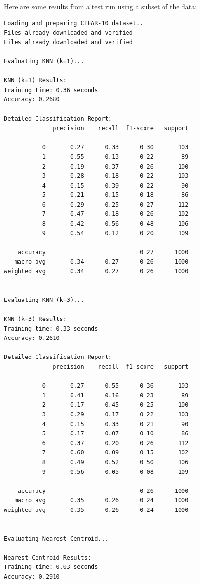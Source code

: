 \documentclass[lettersize,journal]{IEEEtran}
\begin{document}
Here are some results from a test run using a subset of the data:
\begin{verbatim}
Loading and preparing CIFAR-10 dataset...
Files already downloaded and verified
Files already downloaded and verified

Evaluating KNN (k=1)...

KNN (k=1) Results:
Training time: 0.36 seconds
Accuracy: 0.2680

Detailed Classification Report:
              precision    recall  f1-score   support

           0       0.27      0.33      0.30       103
           1       0.55      0.13      0.22        89
           2       0.19      0.37      0.26       100
           3       0.28      0.18      0.22       103
           4       0.15      0.39      0.22        90
           5       0.21      0.15      0.18        86
           6       0.29      0.25      0.27       112
           7       0.47      0.18      0.26       102
           8       0.42      0.56      0.48       106
           9       0.54      0.12      0.20       109

    accuracy                           0.27      1000
   macro avg       0.34      0.27      0.26      1000
weighted avg       0.34      0.27      0.26      1000


Evaluating KNN (k=3)...

KNN (k=3) Results:
Training time: 0.33 seconds
Accuracy: 0.2610

Detailed Classification Report:
              precision    recall  f1-score   support

           0       0.27      0.55      0.36       103
           1       0.41      0.16      0.23        89
           2       0.17      0.45      0.25       100
           3       0.29      0.17      0.22       103
           4       0.15      0.33      0.21        90
           5       0.17      0.07      0.10        86
           6       0.37      0.20      0.26       112
           7       0.60      0.09      0.15       102
           8       0.49      0.52      0.50       106
           9       0.56      0.05      0.08       109

    accuracy                           0.26      1000
   macro avg       0.35      0.26      0.24      1000
weighted avg       0.35      0.26      0.24      1000


Evaluating Nearest Centroid...

Nearest Centroid Results:
Training time: 0.03 seconds
Accuracy: 0.2910


\end{verbatim}
\end{document}
